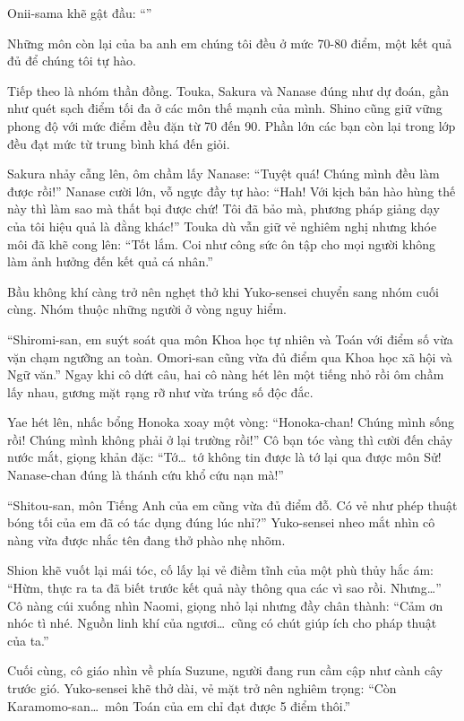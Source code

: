 \documentclass[../main.tex]{subfiles}
\begin{document}
Onii-sama khẽ gật đầu: ``''

Những môn còn lại của ba anh em chúng tôi đều ở mức 70-80 điểm, một kết quả đủ để chúng tôi tự hào.

Tiếp theo là nhóm thần đồng. Touka, Sakura và Nanase đúng như dự đoán, gần như quét sạch điểm tối đa ở các môn thế mạnh của mình. Shino cũng giữ vững phong độ với mức điểm đều đặn từ 70 đến 90. Phần lớn các bạn còn lại trong lớp đều đạt mức từ trung bình khá đến giỏi.

Sakura nhảy cẫng lên, ôm chầm lấy Nanase: ``Tuyệt quá! Chúng mình đều làm được rồi!'' Nanase cười lớn, vỗ ngực đầy tự hào: ``Hah! Với kịch bản hào hùng thế này thì làm sao mà thất bại được chứ! Tôi đã bảo mà, phương pháp giảng dạy của tôi hiệu quả là đằng khác!'' Touka dù vẫn giữ vẻ nghiêm nghị nhưng khóe môi đã khẽ cong lên: ``Tốt lắm. Coi như công sức ôn tập cho mọi người không làm ảnh hưởng đến kết quả cá nhân.''

Bầu không khí càng trở nên nghẹt thở khi Yuko-sensei chuyển sang nhóm cuối cùng. Nhóm thuộc những người ở vòng nguy hiểm.

``Shiromi-san, em suýt soát qua môn Khoa học tự nhiên và Toán với điểm số vừa vặn chạm ngưỡng an toàn. Omori-san cũng vừa đủ điểm qua Khoa học xã hội và Ngữ văn.'' Ngay khi cô dứt câu, hai cô nàng hét lên một tiếng nhỏ rồi ôm chầm lấy nhau, gương mặt rạng rỡ như vừa trúng số độc đắc.

Yae hét lên, nhấc bổng Honoka xoay một vòng: ``Honoka-chan! Chúng mình sống rồi! Chúng mình không phải ở lại trường rồi!'' Cô bạn tóc vàng thì cười đến chảy nước mắt, giọng khản đặc: ``Tớ\dots\ tớ không tin được là tớ lại qua được môn Sử! Nanase-chan đúng là thánh cứu khổ cứu nạn mà!''

``Shitou-san, môn Tiếng Anh của em cũng vừa đủ điểm đỗ. Có vẻ như phép thuật bóng tối của em đã có tác dụng đúng lúc nhỉ?'' Yuko-sensei nheo mắt nhìn cô nàng vừa được nhắc tên đang thở phào nhẹ nhõm.

Shion khẽ vuốt lại mái tóc, cố lấy lại vẻ điềm tĩnh của một phù thủy hắc ám: ``Hừm, thực ra ta đã biết trước kết quả này thông qua các vì sao rồi. Nhưng\dots'' Cô nàng cúi xuống nhìn Naomi, giọng nhỏ lại nhưng đầy chân thành: ``Cảm ơn nhóc tì nhé. Nguồn linh khí của ngươi\dots\ cũng có chút giúp ích cho pháp thuật của ta.''

Cuối cùng, cô giáo nhìn về phía Suzune, người đang run cầm cập như cành cây trước gió. Yuko-sensei khẽ thở dài, vẻ mặt trở nên nghiêm trọng: ``Còn Karamomo-san\dots\ môn Toán của em chỉ đạt được 5 điểm thôi.''
\end{document}
